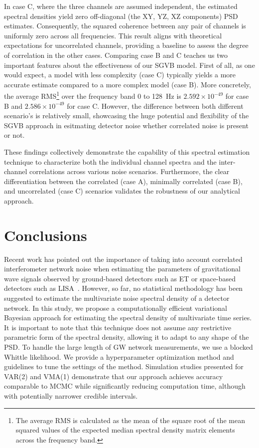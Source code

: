 \documentclass[%
 reprint,
 amsmath,amssymb,
 aps,
 nofootinbib,
]{revtex4-2}
\begin{document}
In case C, where the three channels are assumed independent, the estimated spectral densities yield zero off-diagonal (the XY, YZ, XZ components) PSD estimates.
Consequently, the squared coherence between any pair of channels is uniformly zero across all frequencies.
This result aligns with theoretical expectations for uncorrelated channels,  providing a baseline to assess the degree of correlation in the other cases.
Comparing case B and C teaches us two important features about the effectiveness of our SGVB model. First of all, as one would expect, a model with less complexity (case C) typically yields a more accurate estimate compared to a more complex model (case B). More concretely, the average RMS\footnote{The average RMS is calculated as the mean of the square root of the mean squared values of the expected median spectral density matrix elements across the frequency band.
} over the frequency band 0 to \SI{128}{Hz}  is $2.592 \times 10^{-49}$ for case B and $2.586 \times 10^{-49}$ for case C. However, the difference between both different scenario's is relatively small, showcasing the huge potential and flexibility of the SGVB approach in esitmating detector noise whether correlated noise is present or not.


These findings collectively demonstrate the capability of this spectral estimation technique to characterize both the individual channel spectra and the inter-channel correlations across various noise scenarios.
Furthermore, the clear differentiation between the correlated (case A), minimally correlated (case B), and uncorrelated (case C) scenarios validates the robustness of our analytical approach.



\section{Conclusions}
\label{sec:Discussion}
Recent work has pointed out the importance of taking into account correlated interferometer network noise when estimating the parameters of gravitational wave signals observed by ground-based detectors such as ET or space-based detectors such as LISA~\cite{ET_design_report, Janssens2023, LISA_red_book}.
However, so far, no statistical methodology has been suggested to estimate the multivariate noise spectral density of a detector network.
In this study, we propose a computationally efficient variational Bayesian approach for estimating the spectral density of multivariate time series.
It is important to note that this technique does not assume any restrictive parametric form of the spectral density, allowing it to adapt to any shape of the PSD.
To handle the large length of GW network measurements, we use a blocked Whittle likelihood.
We provide a hyperparameter optimization method and guidelines to tune the settings of the method.
Simulation studies presented for VAR(2) and VMA(1) demonstrate that our approach achieves accuracy comparable to MCMC while significantly reducing computation time, although with potentially narrower credible intervals.
\end{document}
